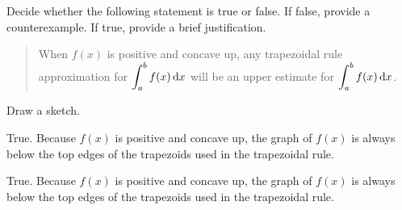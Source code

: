 \begin{Mquestion}[2015A]
Decide whether the following statement is true or false.
If false, provide a counterexample. If true, provide a brief justification.

\begin{quote}\color{blue}
When $f(x)$ is positive and concave up, any trapezoidal rule approximation for $\displaystyle\int_{a}^{b} f(x) \,\mathrm{d}x$ will be an upper estimate for $\displaystyle\int_{a}^{b} f(x) \,\mathrm{d}x$.
\end{quote}
\end{Mquestion}

\begin{hint}
Draw a sketch.
\end{hint}

\begin{answer}
True. Because $f(x)$ is positive and concave up,
the graph of $f(x)$ is always below the top edges of the trapezoids
used in the trapezoidal rule.

\begin{center}
\end{center}
\end{answer}

\begin{solution}
True. Because $f(x)$ is positive and concave up,
the graph of $f(x)$ is always below the top edges of the trapezoids
used in the trapezoidal rule.

\begin{center}
\end{center}
\end{solution}


